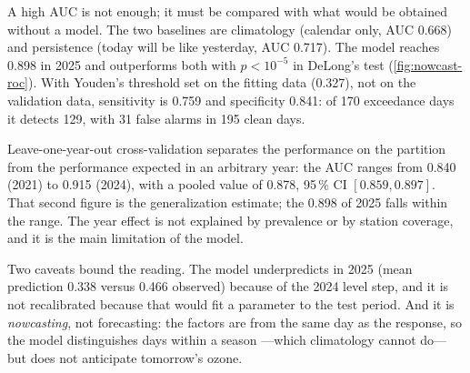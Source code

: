 A high AUC is not enough; it must be compared with what would be obtained
without a model. The two baselines are climatology (calendar only, AUC 0.668)
and persistence (today will be like yesterday, AUC 0.717). The model reaches
0.898 in 2025 and outperforms both with $p<10^{-5}$ in DeLong's test
(\cref{fig:nowcast-roc}). With Youden's threshold set on the fitting data
(0.327), not on the validation data, sensitivity is 0.759 and specificity
0.841: of 170 exceedance days it detects 129, with 31 false alarms in 195
clean days.

Leave-one-year-out cross-validation separates the performance on the
partition from the performance expected in an arbitrary year: the AUC ranges
from 0.840 (2021) to 0.915 (2024), with a pooled value of 0.878, 95\,\% CI
$[0.859, 0.897]$. That second figure is the generalization estimate; the
0.898 of 2025 falls within the range. The year effect is not explained by
prevalence or by station coverage, and it is the main limitation of the
model.

Two caveats bound the reading. The model underpredicts in 2025 (mean
prediction 0.338 versus 0.466 observed) because of the 2024 level step, and
it is not recalibrated because that would fit a parameter to the test
period. And it is \emph{nowcasting}, not forecasting: the factors are from
the same day as the response, so the model distinguishes days within a
season ---which climatology cannot do--- but does not anticipate tomorrow's
ozone.
